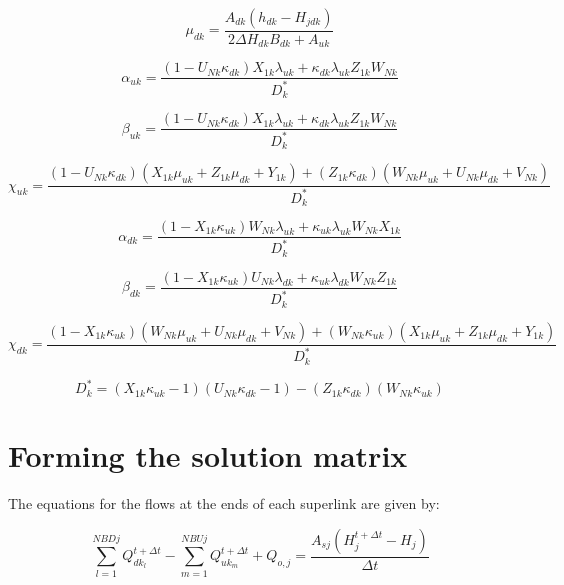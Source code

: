 \documentclass[11pt]{article}
\begin{document}
\begin{equation}
  \mu_{dk} = \frac{A_{dk} (h_{dk} - H_{jdk})}{2 \Delta H_{dk} B_{dk} + A_{uk}}
\end{equation}

\begin{equation}
  \alpha_{uk} = \frac{(1 - U_{Nk} \kappa_{dk}) X_{1k} \lambda_{uk} + \kappa_{dk} \lambda_{uk} Z_{1k} W_{Nk}}{D_k^{*}}
\end{equation}

\begin{equation}
  \beta_{uk} = \frac{(1 - U_{Nk} \kappa_{dk}) X_{1k} \lambda_{uk} + \kappa_{dk} \lambda_{uk} Z_{1k} W_{Nk}}{D_k^{*}}
\end{equation}

\begin{equation}
  \chi_{uk} = \frac{(1 - U_{Nk} \kappa_{dk}) (X_{1k} \mu_{uk} + Z_{1k} \mu_{dk} + Y_{1k}) + (Z_{1k} \kappa_{dk})(W_{Nk} \mu_{uk} + U_{Nk} \mu_{dk} + V_{Nk})}{D_k^{*}}
\end{equation}

\begin{equation}
  \alpha_{dk} = \frac{(1 - X_{1k} \kappa_{uk}) W_{Nk} \lambda_{uk} + \kappa_{uk} \lambda_{uk} W_{Nk} X_{1k}}{D_k^{*}}
\end{equation}

\begin{equation}
  \beta_{dk} = \frac{(1 - X_{1k} \kappa_{uk}) U_{Nk} \lambda_{dk} + \kappa_{uk} \lambda_{dk} W_{Nk} Z_{1k}}{D_k^{*}}
\end{equation}

\begin{equation}
  \chi_{dk} = \frac{(1 - X_{1k} \kappa_{uk}) (W_{Nk} \mu_{uk} + U_{Nk} \mu_{dk} + V_{Nk}) + (W_{Nk} \kappa_{uk})(X_{1k} \mu_{uk} + Z_{1k} \mu_{dk} + Y_{1k})}{D_k^{*}}
\end{equation}

\begin{equation}
  D_k^* = (X_{1k} \kappa_{uk} - 1)(U_{Nk} \kappa_{dk} - 1) - (Z_{1k} \kappa_{dk})(W_{Nk} \kappa_{uk})
\end{equation}


\section{Forming the solution matrix}

The equations for the flows at the ends of each superlink are given by:

\begin{equation}
  \sum_{l=1}^{NBDj} Q_{dk_l}^{t + \Delta t} - \sum_{m=1}^{NBUj} Q_{uk_m}^{t + \Delta t} + Q_{o,j} = \frac{A_{sj} (H_j^{t + \Delta t} - H_j)}{\Delta t}
\end{equation}
\end{document}
